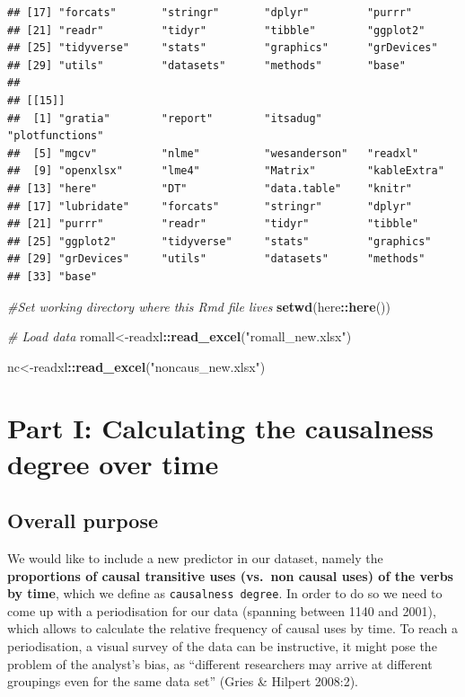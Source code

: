 \documentclass[
]{article}
\newenvironment{Shaded}{\begin{snugshade}}{\end{snugshade}}
\newcommand{\CommentTok}[1]{\textcolor[rgb]{0.56,0.35,0.01}{\textit{#1}}}
\newcommand{\FunctionTok}[1]{\textcolor[rgb]{0.13,0.29,0.53}{\textbf{#1}}}
\newcommand{\NormalTok}[1]{#1}
\newcommand{\OtherTok}[1]{\textcolor[rgb]{0.56,0.35,0.01}{#1}}
\newcommand{\SpecialCharTok}[1]{\textcolor[rgb]{0.81,0.36,0.00}{\textbf{#1}}}
\newcommand{\StringTok}[1]{\textcolor[rgb]{0.31,0.60,0.02}{#1}}
\begin{document}
\begin{verbatim}
## [17] "forcats"       "stringr"       "dplyr"         "purrr"        
## [21] "readr"         "tidyr"         "tibble"        "ggplot2"      
## [25] "tidyverse"     "stats"         "graphics"      "grDevices"    
## [29] "utils"         "datasets"      "methods"       "base"         
## 
## [[15]]
##  [1] "gratia"        "report"        "itsadug"       "plotfunctions"
##  [5] "mgcv"          "nlme"          "wesanderson"   "readxl"       
##  [9] "openxlsx"      "lme4"          "Matrix"        "kableExtra"   
## [13] "here"          "DT"            "data.table"    "knitr"        
## [17] "lubridate"     "forcats"       "stringr"       "dplyr"        
## [21] "purrr"         "readr"         "tidyr"         "tibble"       
## [25] "ggplot2"       "tidyverse"     "stats"         "graphics"     
## [29] "grDevices"     "utils"         "datasets"      "methods"      
## [33] "base"
\end{verbatim}

\begin{Shaded}
\begin{Highlighting}[]
\CommentTok{\#Set working directory where this Rmd file lives}
\FunctionTok{setwd}\NormalTok{(here}\SpecialCharTok{::}\FunctionTok{here}\NormalTok{())}

\CommentTok{\# Load data}
\NormalTok{  romall}\OtherTok{\textless{}{-}}\NormalTok{readxl}\SpecialCharTok{::}\FunctionTok{read\_excel}\NormalTok{(}\StringTok{"romall\_new.xlsx"}\NormalTok{)}
  
\NormalTok{  nc}\OtherTok{\textless{}{-}}\NormalTok{readxl}\SpecialCharTok{::}\FunctionTok{read\_excel}\NormalTok{(}\StringTok{"noncaus\_new.xlsx"}\NormalTok{)}
\end{Highlighting}
\end{Shaded}

\section{Part I: Calculating the causalness degree over
time}\label{part-i-calculating-the-causalness-degree-over-time}

\subsection{Overall purpose}\label{overall-purpose}

We would like to include a new predictor in our dataset, namely the
\textbf{proportions of causal transitive uses (vs.~non causal uses) of
the verbs by time}, which we define as \texttt{causalness\ degree}. In
order to do so we need to come up with a periodisation for our data
(spanning between 1140 and 2001), which allows to calculate the relative
frequency of causal uses by time. To reach a periodisation, a visual
survey of the data can be instructive, it might pose the problem of the
analyst's bias, as ``different researchers may arrive at different
groupings even for the same data set'' (Gries \& Hilpert 2008:2).
\end{document}
